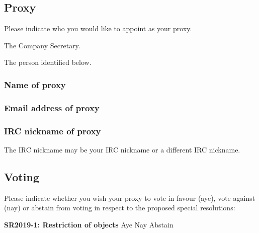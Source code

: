 \documentclass[a4paper,10pt]{article}
\begin{document}
\begin{Form}
\subsection{Proxy}

Please indicate who you would like to appoint as your proxy.

\ChoiceMenu[radio,radiosymbol=\ding{108},name=proxyradio]{ }{ } The Company Secretary.

\ChoiceMenu[radio,radiosymbol=\ding{108},name=proxyradio]{ }{ } The person identified below.

\subsubsection{Name of proxy}

\begin{framed}%
  \TextField[width=\textwidth,donotscroll=true,name=proxyname]{ }%
\end{framed}%

\subsubsection{Email address of proxy}

\begin{framed}%
  \TextField[width=\textwidth,donotscroll=true,name=proxyemail]{ }%
\end{framed}%

\subsubsection{IRC nickname of proxy}

The IRC nickname may be your IRC nickname or a different IRC nickname.

\begin{framed}%
  \TextField[width=\textwidth,donotscroll=true,name=proxynickname]{ }%
\end{framed}%

\subsection{Voting}

Please indicate whether you wish your proxy to vote in favour (aye), vote against (nay) or abstain from voting in respect to the proposed special resolutions:

\textbf{SR2019-1: Restriction of objects} \hfill
\ChoiceMenu[radio,radiosymbol=\ding{108},name=sr1]{ }{ }Aye
\ChoiceMenu[radio,radiosymbol=\ding{108},name=sr1]{ }{ }Nay
\ChoiceMenu[radio,radiosymbol=\ding{108},name=sr1]{ }{ }Abstain


\end{Form}
\end{document}
